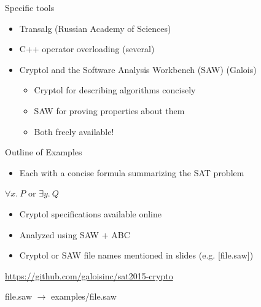 \documentclass[ignorenonframetext,]{beamer}
\providecommand{\tightlist}{%
  \setlength{\itemsep}{0pt}\setlength{\parskip}{0pt}}
\newcommand{\infile}[1]{{\tiny \alert{[#1]}}}
\newcommand{\filelink}[1]{{\alert{#1}}}
\newcommand{\aurl}[1]{\alert{\url{#1}}}
\begin{document}
\begin{frame}{Specific tools}

\begin{itemize}
\tightlist
\item
  Transalg (Russian Academy of Sciences) \cite{transalg}
\item
  C++ operator overloading (several) \cite{jovanovic2005logical}
\item
  Cryptol and the Software Analysis Workbench (SAW) (Galois)

  \begin{itemize}
  \tightlist
  \item
    Cryptol for describing algorithms concisely
  \item
    SAW for proving properties about them
  \item
    Both freely available!
  \end{itemize}
\end{itemize}

\end{frame}

\begin{frame}{Outline of Examples}

\begin{itemize}
\tightlist
\item
  Each with a concise formula summarizing the SAT problem
\end{itemize}

\begin{center}
$\forall x.~P$ or $\exists y.~Q$
\end{center}

\begin{itemize}
\item
  Cryptol specifications available online
\item
  Analyzed using SAW + ABC
\item
  Cryptol or SAW file names mentioned in slides (e.g. \infile{file.saw})
\end{itemize}

\begin{center}
\aurl{https://github.com/galoisinc/sat2015-crypto}
\end{center}

\begin{center}
\filelink{file.saw} $\rightarrow$ \filelink{examples/file.saw}
\end{center}

\end{frame}
\end{document}
